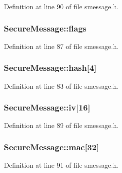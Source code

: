Definition at line 90 of file smessage.\+h.

\hypertarget{class_secure_message_a753fd0eac0696882e5a7775e3d56604c}{}
\subsubsection[{flags}]{ Secure\+Message\+::flags}\label{class_secure_message_a753fd0eac0696882e5a7775e3d56604c}


Definition at line 87 of file smessage.\+h.

\hypertarget{class_secure_message_a922e818b7d08a351ccf6298fd8b9e312}{}
\subsubsection[{hash}]{ Secure\+Message\+::hash\mbox{[}4\mbox{]}}\label{class_secure_message_a922e818b7d08a351ccf6298fd8b9e312}


Definition at line 83 of file smessage.\+h.

\hypertarget{class_secure_message_ad6f6a76b680f346e4738e40a52479b17}{}
\subsubsection[{iv}]{ Secure\+Message\+::iv\mbox{[}16\mbox{]}}\label{class_secure_message_ad6f6a76b680f346e4738e40a52479b17}


Definition at line 89 of file smessage.\+h.

\hypertarget{class_secure_message_abf74073a4e3cab2ee76868c4aa5f3641}{}
\subsubsection[{mac}]{ Secure\+Message\+::mac\mbox{[}32\mbox{]}}\label{class_secure_message_abf74073a4e3cab2ee76868c4aa5f3641}


Definition at line 91 of file smessage.\+h.

